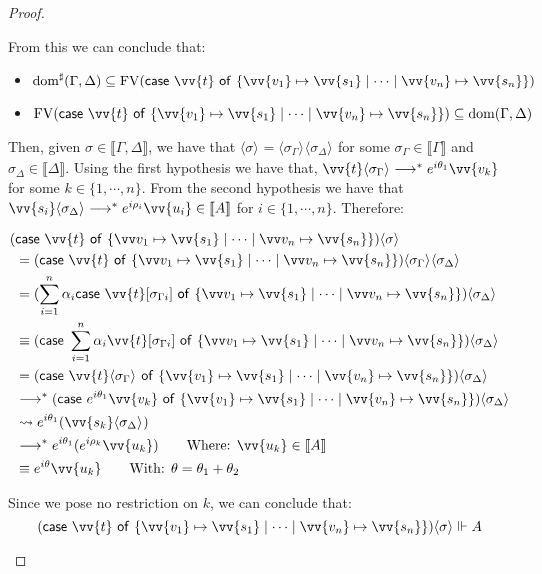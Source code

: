 \documentclass[runningheads,orivec,envcountsame,envcountsect]{llncs}
\newcommand\lra{\longrightarrow}
\newcommand\ansubst[2]{\ensuremath{\langle #1 \rangle_{#2}}}
\newcommand\dom[1]{\mathrm{dom}(#1)}
\newcommand\sdom[1]{\mathrm{dom}^{\sharp}(#1)}
\newcommand\FV[1]{\mathrm{FV}(#1)}
\def\gencase#1#2#3#4#5{\ensuremath{\mathsf{case}~#1~\mathsf{of}~\{#2\mapsto #4 \mid \dotsb \mid #3\mapsto #5\}}}
\def\lraneq{\rightsquigarrow}
\def\eval{\lra^*}
\def\sem#1{\llbracket#1\rrbracket}
\def\real{\Vdash}
\begin{document}
\begin{proof}
\begin{description}
    From this we can conclude that:
    
    \begin{itemize}
        \item $\sdom{\Gamma,\Delta}\subseteq \FV{\gencase{\vv{t}}{\vv{v_1}}{\vv {v_n}}{\vv{s_1}}{\vv{s_n}}}$
        \item $\FV{\gencase{\vv{t}}{\vv{v_1}}{\vv {v_n}}{\vv{s_1}}{\vv{s_n}}}\subseteq \dom{\Gamma,\Delta}$
    \end{itemize}


    
    Then, given $\sigma\in\sem{\Gamma,\Delta}$, we have that $\ansubst{\sigma}{}=\ansubst{\sigma_\Gamma}{}\ansubst{\sigma_\Delta}{}$ for some $\sigma_\Gamma\in\sem{\Gamma}$ and $\sigma_\Delta\in\sem{\Delta}$. Using the first hypothesis we have that, $\vv{t}\ansubst{\sigma_\Gamma}{}\eval e^{i\theta_1}\vv{v_k}$ for some $k\in\{1,\dotsb ,n\}$. From the second hypothesis we have that $\vv{s_i}\ansubst{\sigma_\Delta}{}\eval e^{i\rho_i}\vv{u_i}\in\sem{A}$ for $i\in\{1,\dotsb , n\}$. Therefore:

    \begin{align*}
        (&\gencase{\vv{t}}{\vv v_1}{\vv v_n}{\vv{s_1}}{\vv{s_n}})\ansubst{\sigma}{}\\ 
        &= (\gencase{\vv{t}}{\vv v_1}{\vv v_n}{\vv{s_1}}{\vv{s_n}})\ansubst{\sigma_\Gamma}{}\ansubst{\sigma_\Delta}{}\\
        &= (\sum_{i=1}^{n}\alpha_i \gencase{\vv{t}[\sigma_{\Gamma i}]}{\vv v_1}{\vv v_n}{\vv{s_1}}{\vv{s_n}})\ansubst{\sigma_\Delta}{} \\
        &\equiv (\gencase{\sum_{i=1}^{n} \alpha_i \vv{t}[\sigma_{\Gamma i}]}{\vv v_1}{\vv v_n}{\vv{s_1}}{\vv{s_n}})\ansubst{\sigma_\Delta}{}\\
        &=(\gencase{\vv{t}\ansubst{\sigma_\Gamma}{}}{\vv{v_1}}{\vv{v_n}}{\vv{s_1}}{\vv{s_n}})\ansubst{\sigma_\Delta}{}\\
        &\eval(\gencase{e^{i\theta_1}\vv{v_k}}{\vv{v_1}}{\vv{v_n}}{\vv{s_1}}{\vv{s_n}})\ansubst{\sigma_\Delta}{}\\
        &\lraneq e^{i\theta_1}(\vv{s_k}\ansubst{\sigma_\Delta}{})\\
        &\eval e^{i\theta_1}(e^{i\rho_k} \vv{u_k})\qquad\text{Where: }\vv{u_k}\in\sem{A}\\
        &\equiv e^{i\theta} \vv{u_k}\qquad\text{With: }\theta=\theta_1 +\theta_2
    \end{align*}
    
    Since we pose no restriction on $k$, we can conclude that:
    \[(\gencase{\vv{t}}{\vv{v_1}}{\vv{v_n}}{\vv{s_1}}{\vv{s_n}})\ansubst{\sigma}{}\real A\]



\end{description}
\end{proof}
\end{document}
